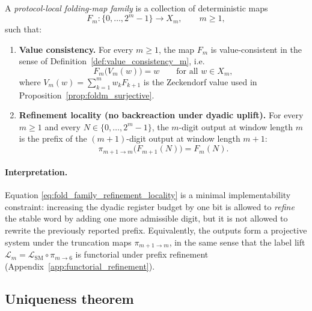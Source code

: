 \begin{definition}\label{def:protocol_local_fold_family}
A \emph{protocol-local folding-map family} is a collection of deterministic maps
\[
F_m:\{0,\dots,2^m-1\}\to X_m,\qquad m\ge 1,
\]
such that:
\begin{enumerate}
\item \textbf{Value consistency.} For every $m\ge 1$, the map $F_m$ is value-consistent in the sense of Definition~\ref{def:value_consistency_m}, i.e.
\[
F_m\!\bigl(V_m(w)\bigr)=w\qquad\text{for all }w\in X_m,
\]
where $V_m(w)=\sum_{k=1}^m w_k F_{k+1}$ is the Zeckendorf value used in Proposition~\ref{prop:foldm_surjective}.
\item \textbf{Refinement locality (no backreaction under dyadic uplift).}
For every $m\ge 1$ and every $N\in\{0,\dots,2^m-1\}$, the $m$-digit output at window length $m$ is the prefix of the $(m+1)$-digit output at window length $m+1$:
\begin{equation}\label{eq:fold_family_refinement_locality}
\pi_{m+1\to m}\!\bigl(F_{m+1}(N)\bigr)=F_m(N).
\end{equation}
\end{enumerate}
\end{definition}

\paragraph{Interpretation.}
Equation \eqref{eq:fold_family_refinement_locality} is a minimal implementability constraint: increasing the dyadic register budget by one bit is allowed to \emph{refine} the stable word by adding one more admissible digit, but it is not allowed to rewrite the previously reported prefix.
Equivalently, the outputs form a projective system under the truncation maps $\pi_{m+1\to m}$, in the same sense that the label lift $\mathcal{L}_m=\mathcal{L}_{\mathrm{SM}}\circ\pi_{m\to 6}$ is functorial under prefix refinement (Appendix~\ref{app:functorial_refinement}).

\subsection{Uniqueness theorem}
\label{subsec:fold_family_uniqueness_theorem}

